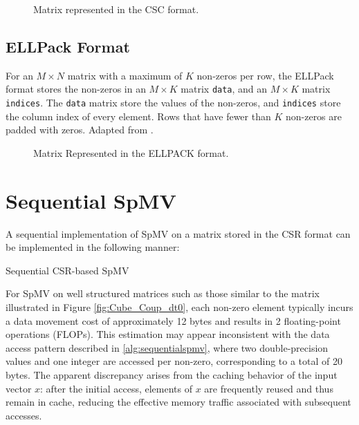 \begin{figure}[H]
    \centering
    \caption{Matrix represented in the CSC format.}
    \label{fig:cscformat}
\end{figure}

\subsection{ELLPack Format}
For an \(M \times  N\) matrix with a maximum of \(K\) non-zeros per row, the ELLPack format stores the non-zeros in an \(M \times  K\) matrix \texttt{data}, and an \(M \times  K\) matrix \texttt{indices}. The \texttt{data} matrix store the values of the non-zeros, and \texttt{indices} store the column index of every element. Rows that have fewer than \(K\) non-zeros are padded with zeros. Adapted from \cite{ellpackformat}.

\begin{figure}[ht]
    \centering
    \caption{Matrix Represented in the ELLPACK format.}
    \label{fig:ellpackformat}
\end{figure}


\section{Sequential SpMV}
A sequential implementation of SpMV on a matrix stored in the CSR format can be implemented in the following manner:
\medskip

\begin{algorithm}[htbp]
    \caption{Sequential CSR-based SpMV}
    \SetAlgoVlined

\end{algorithm}
\label{alg:sequentialspmv}
\medskip

For SpMV on well structured matrices such as those similar to the matrix illustrated in Figure \ref{fig:Cube_Coup_dt0}, each non-zero element typically incurs a data movement cost of approximately 12 bytes and results in 2 floating-point operations (FLOPs). This estimation may appear inconsistent with the data access pattern described in \autoref{alg:sequentialspmv}, where two double-precision values and one integer are accessed per non-zero, corresponding to a total of 20 bytes. The apparent discrepancy arises from the caching behavior of the input vector \(x\): after the initial access, elements of \(x\) are frequently reused and thus remain in cache, reducing the effective memory traffic associated with subsequent accesses.
\medskip

